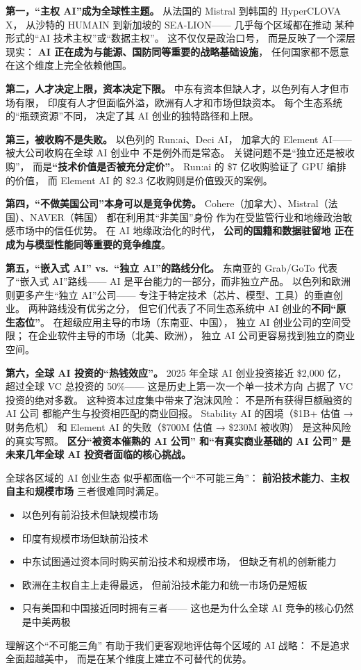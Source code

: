 \textbf{第一，``主权 AI''成为全球性主题。}
从法国的 Mistral 到韩国的 HyperCLOVA X，
从沙特的 HUMAIN 到新加坡的 SEA-LION——
几乎每个区域都在推动
某种形式的``AI 技术主权''或``数据主权''。
这不仅仅是政治口号，
而是反映了一个深层现实：
\textbf{AI 正在成为与能源、国防同等重要的战略基础设施}，
任何国家都不愿意在这个维度上完全依赖他国。

\textbf{第二，人才决定上限，资本决定下限。}
中东有资本但缺人才，以色列有人才但市场有限，
印度有人才但面临外溢，欧洲有人才和市场但缺资本。
每个生态系统的``瓶颈资源''不同，
决定了其 AI 创业的独特路径和上限。

\textbf{第三，被收购不是失败。}
以色列的 Run:ai、Deci AI，
加拿大的 Element AI——
被大公司收购在全球 AI 创业中
不是例外而是常态。
关键问题不是``独立还是被收购''，
而是\textbf{``技术价值是否被充分定价''}。
Run:ai 的 \$7 亿收购验证了 GPU 编排的价值，
而 Element AI 的 \$2.3 亿收购则是价值毁灭的案例。

\textbf{第四，``不做美国公司''本身可以是竞争优势。}
Cohere（加拿大）、Mistral（法国）、NAVER（韩国）
都在利用其``非美国''身份
作为在受监管行业和地缘政治敏感市场中的信任优势。
在 AI 地缘政治化的时代，
\textbf{公司的国籍和数据驻留地
正在成为与模型性能同等重要的竞争维度}。

\textbf{第五，``嵌入式 AI'' vs.\ ``独立 AI''的路线分化。}
东南亚的 Grab/GoTo 代表了``嵌入式 AI''路线——
AI 是平台能力的一部分，而非独立产品。
以色列和欧洲则更多产生``独立 AI''公司——
专注于特定技术（芯片、模型、工具）的垂直创业。
两种路线没有优劣之分，
但它们代表了不同生态系统中
AI 创业的\textbf{不同``原生态位''}。
在超级应用主导的市场（东南亚、中国），
独立 AI 创业公司的空间受限；
在企业软件主导的市场（北美、欧洲），
独立 AI 公司更容易找到独立的商业空间。

\textbf{第六，全球 AI 投资的``热钱效应''。}
2025 年全球 AI 创业投资接近 \$2,000 亿，
超过全球 VC 总投资的 50\%——
这是历史上第一次一个单一技术方向
占据了 VC 投资的绝对多数。
这种资本过度集中带来了泡沫风险：
不是所有获得巨额融资的 AI 公司
都能产生与投资相匹配的商业回报。
Stability AI 的困境（\$1B+ 估值 → 财务危机）
和 Element AI 的失败（\$700M 估值 → \$230M 被收购）
是这种风险的真实写照。
\textbf{区分``被资本催熟的 AI 公司''
和``有真实商业基础的 AI 公司''
是未来几年全球 AI 投资者面临的核心挑战。}

\begin{warnbox}
全球各区域的 AI 创业生态
似乎都面临一个``不可能三角''：
\textbf{前沿技术能力}、\textbf{主权自主}和\textbf{规模市场}
三者很难同时满足。
\begin{itemize}[noitemsep]
  \item 以色列有前沿技术但缺规模市场
  \item 印度有规模市场但缺前沿技术
  \item 中东试图通过资本同时购买前沿技术和规模市场，
        但缺乏有机的创新能力
  \item 欧洲在主权自主上走得最远，
        但前沿技术能力和统一市场仍是短板
  \item 只有美国和中国接近同时拥有三者——
        这也是为什么全球 AI 竞争的核心仍然是中美两极
\end{itemize}
理解这个``不可能三角''
有助于我们更客观地评估每个区域的 AI 战略：
不是追求全面超越美中，
而是在某个维度上建立不可替代的优势。
\end{warnbox}

